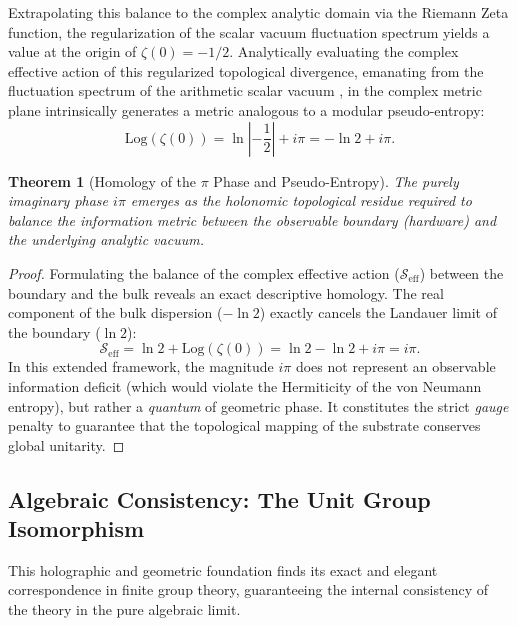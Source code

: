 \documentclass[reprint,aps,pra,superscriptaddress,nofootinbib]{revtex4-2}
\theoremstyle{plain}
\newtheorem{theorem}{Theorem}[section]
\theoremstyle{definition}
\theoremstyle{remark}
\begin{document}
Extrapolating this balance to the complex analytic domain via the Riemann Zeta function, the regularization of the scalar vacuum fluctuation spectrum yields a value at the origin of $\zeta(0) = -1/2$. Analytically evaluating the complex effective action of this regularized topological divergence, emanating from the fluctuation spectrum of the arithmetic scalar vacuum \cite{Peinador_Vacuum_Alpha_2025}, in the complex metric plane intrinsically generates a metric analogous to a modular pseudo-entropy:
\begin{equation}
    \text{Log}(\zeta(0)) = \ln\left|-\frac{1}{2}\right| + i\pi = -\ln 2 + i\pi.
\end{equation}

\begin{theorem}[Homology of the $\pi$ Phase and Pseudo-Entropy]
The purely imaginary phase $i\pi$ emerges as the holonomic topological residue required to balance the information metric between the observable boundary (hardware) and the underlying analytic vacuum.
\end{theorem}
\begin{proof}
Formulating the balance of the complex effective action ($\mathcal{S}_{\text{eff}}$) between the boundary and the bulk reveals an exact descriptive homology. The real component of the bulk dispersion ($-\ln 2$) exactly cancels the Landauer limit of the boundary ($\ln 2$):
\begin{equation}
    \mathcal{S}_{\text{eff}} = \ln 2 + \text{Log}(\zeta(0)) = \ln 2 - \ln 2 + i\pi = i\pi.
\end{equation}
In this extended framework, the magnitude $i\pi$ does not represent an observable information deficit (which would violate the Hermiticity of the von Neumann entropy), but rather a \textit{quantum} of geometric phase. It constitutes the strict \textit{gauge} penalty to guarantee that the topological mapping of the substrate conserves global unitarity.
\end{proof}

\subsection{Algebraic Consistency: The Unit Group Isomorphism}
\label{subsec:isomorfismo_unidades}

This holographic and geometric foundation finds its exact and elegant correspondence in finite group theory, guaranteeing the internal consistency of the theory in the pure algebraic limit.
\end{document}
